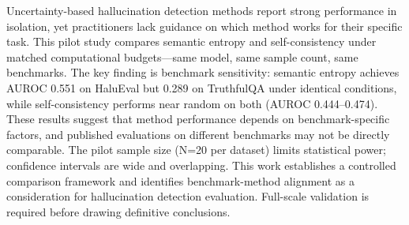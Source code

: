 
Uncertainty-based hallucination detection methods report strong performance in isolation, yet practitioners lack guidance on which method works for their specific task. This pilot study compares semantic entropy and self-consistency under matched computational budgets---same model, same sample count, same benchmarks. The key finding is benchmark sensitivity: semantic entropy achieves AUROC 0.551 on HaluEval but 0.289 on TruthfulQA under identical conditions, while self-consistency performs near random on both (AUROC 0.444--0.474). These results suggest that method performance depends on benchmark-specific factors, and published evaluations on different benchmarks may not be directly comparable. The pilot sample size (N=20 per dataset) limits statistical power; confidence intervals are wide and overlapping. This work establishes a controlled comparison framework and identifies benchmark-method alignment as a consideration for hallucination detection evaluation. Full-scale validation is required before drawing definitive conclusions.
